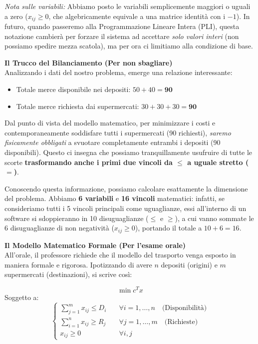 \documentclass[12pt, a4paper]{article}
\newcommand{\separatore}{\noindent{\color{titlecolor!50}\rule{\textwidth}{0.6pt}}}
\begin{document}
	\textit{Nota sulle variabili:} Abbiamo posto le variabili semplicemente maggiori o uguali a zero ($x_{ij} \geq 0$, che algebricamente equivale a una matrice identità con i $-1$). In futuro, quando passeremo alla Programmazione Lineare Intera (PLI), questa notazione cambierà per forzare il sistema ad accettare \textit{solo valori interi} (non possiamo spedire mezza scatola), ma per ora ci limitiamo alla condizione di base.
	
	\vspace{0.4cm}
	\textbf{Il Trucco del Bilanciamento (Per non sbagliare)}\\
	Analizzando i dati del nostro problema, emerge una relazione interessante:
	\begin{itemize}[label=$\circ$, itemsep=2pt, leftmargin=1.5cm]
		\item Totale merce disponibile nei depositi: $50 + 40 = \textbf{90}$
		\item Totale merce richiesta dai supermercati: $30 + 30 + 30 = \textbf{90}$
	\end{itemize}
	Dal punto di vista del modello matematico, per minimizzare i costi e contemporaneamente soddisfare tutti i supermercati (90 richiesti), \textit{saremo fisicamente obbligati} a svuotare completamente entrambi i depositi (90 disponibili). 
	Questo ci insegna che possiamo tranquillamente usufruire di tutte le scorte \textbf{trasformando anche i primi due vincoli da $\leq$ a uguale stretto ($=$)}. 
	
	Conoscendo questa informazione, possiamo calcolare esattamente la dimensione del problema. Abbiamo \textbf{6 variabili} e \textbf{16 vincoli} matematici: infatti, se consideriamo tutti i 5 vincoli principali come uguaglianze, essi all'interno di un software si sdoppieranno in 10 disuguaglianze ($\leq$ e $\geq$), a cui vanno sommate le 6 disuguaglianze di non negatività ($x_{ij} \geq 0$), portando il totale a $10 + 6 = 16$.
	
	\vspace{0.6cm}
	\separatore
	\vspace{0.4cm}
	
	\textbf{Il Modello Matematico Formale (Per l'esame orale)}\\
	All'orale, il professore richiede che il modello del trasporto venga esposto in maniera formale e rigorosa. Ipotizzando di avere $n$ depositi (origini) e $m$ supermercati (destinazioni), si scrive così:
	
	\[
	\min c^T x
	\]
	Soggetto a:
	\[
	\begin{cases}
		\displaystyle \sum_{j=1}^{m} x_{ij} \leq D_i \quad &\forall i = 1, \dots, n \quad \text{(Disponibilità)}\\[15pt]
		\displaystyle \sum_{i=1}^{n} x_{ij} \geq R_j \quad &\forall j = 1, \dots, m \quad \text{(Richieste)}\\[15pt]
		x_{ij} \geq 0 \quad &\forall i, j
	\end{cases}
	\]
	
\end{document}
